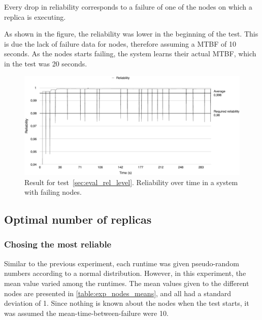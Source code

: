 \documentclass{cslthse-msc}
\begin{document}
Every drop in reliability corresponds to a failure of one of the nodes on which a replica is executing.

As shown in the figure, the reliability was lower in the beginning of the test. This is due the lack of failure data for nodes, therefore assuming a MTBF of 10 seconds. As the nodes starts failing, the system learns their actual MTBF, which in the test was 20 seconds.

\begin{figure}[!hbt]
\centering
\includegraphics[scale=0.5]{images/results/reliability.pdf}
\caption{Result for test~\ref{sec:eval_rel_level}. Reliability over time in a system with failing nodes.} \label{fig:exp_reliability_level}
\end{figure}

\subsection{Optimal number of replicas}
\subsubsection{Chosing the most reliable} \label{sec:eval_opt_nbr_replicas}
Similar to the previous experiment, each runtime was given pseudo-random numbers according to a normal distribution. However, in this experiment, the mean value varied among the runtimes. The mean values given to the different nodes are presented in \cref{table:exp_nodes_means}, and all had a standard deviation of 1. Since nothing is known about the nodes when the test starts, it was assumed the mean-time-between-failure were 10. 
\end{document}
